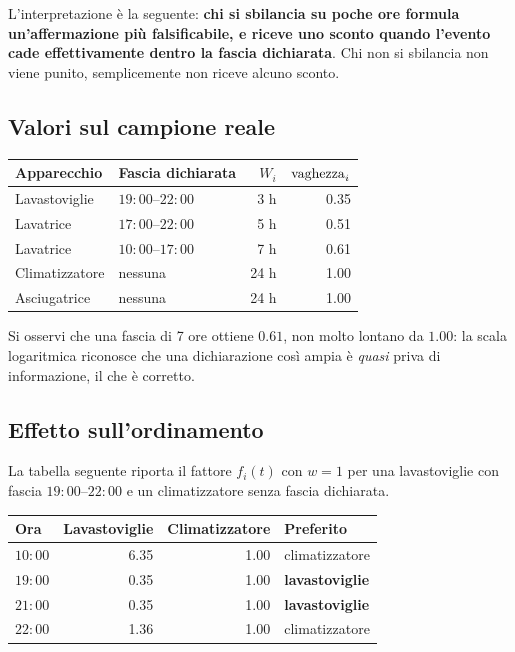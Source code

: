 L'interpretazione è la seguente: \textbf{chi si sbilancia su poche ore formula un'affermazione più
falsificabile, e riceve uno sconto quando l'evento cade effettivamente dentro la fascia
dichiarata}. Chi non si sbilancia non viene punito, semplicemente non riceve alcuno sconto.

\subsection{Valori sul campione reale}

\begin{center}
\begin{tabular}{@{}l l r r@{}}
\toprule
\textbf{Apparecchio} & \textbf{Fascia dichiarata} & $W_i$ & $\operatorname{vaghezza}_i$ \\
\midrule
Lavastoviglie   & $19{:}00$--$22{:}00$ & 3 h  & 0.35 \\
Lavatrice       & $17{:}00$--$22{:}00$ & 5 h  & 0.51 \\
Lavatrice       & $10{:}00$--$17{:}00$ & 7 h  & 0.61 \\
Climatizzatore  & nessuna              & 24 h & 1.00 \\
Asciugatrice    & nessuna              & 24 h & 1.00 \\
\bottomrule
\end{tabular}
\end{center}

Si osservi che una fascia di 7 ore ottiene $0.61$, non molto lontano da $1.00$: la scala
logaritmica riconosce che una dichiarazione così ampia è \emph{quasi} priva di informazione, il che
è corretto.

\subsection{Effetto sull'ordinamento}

La tabella seguente riporta il fattore $f_i(t)$ con $w = 1$ per una lavastoviglie con fascia
$19{:}00$--$22{:}00$ e un climatizzatore senza fascia dichiarata.

\begin{center}
\begin{tabular}{@{}l r r l@{}}
\toprule
\textbf{Ora} & \textbf{Lavastoviglie} & \textbf{Climatizzatore} & \textbf{Preferito} \\
\midrule
$10{:}00$ & 6.35 & 1.00 & climatizzatore \\
$19{:}00$ & 0.35 & 1.00 & \textbf{lavastoviglie} \\
$21{:}00$ & 0.35 & 1.00 & \textbf{lavastoviglie} \\
$22{:}00$ & 1.36 & 1.00 & climatizzatore \\
\bottomrule
\end{tabular}
\end{center}

